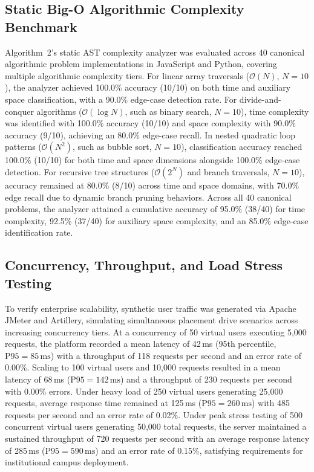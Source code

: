 \documentclass[conference]{IEEEtran}
\begin{document}
\subsection{Static Big-O Algorithmic Complexity Benchmark}
Algorithm~2's static AST complexity analyzer was evaluated across 40 canonical algorithmic problem implementations in JavaScript and Python, covering multiple algorithmic complexity tiers. For linear array traversals ($\mathcal{O}(N)$, $N=10$), the analyzer achieved 100.0\% accuracy (10/10) on both time and auxiliary space classification, with a 90.0\% edge-case detection rate. For divide-and-conquer algorithms ($\mathcal{O}(\log N)$, such as binary search, $N=10$), time complexity was identified with 100.0\% accuracy (10/10) and space complexity with 90.0\% accuracy (9/10), achieving an 80.0\% edge-case recall. In nested quadratic loop patterns ($\mathcal{O}(N^2)$, such as bubble sort, $N=10$), classification accuracy reached 100.0\% (10/10) for both time and space dimensions alongside 100.0\% edge-case detection. For recursive tree structures ($\mathcal{O}(2^N)$ and branch traversals, $N=10$), accuracy remained at 80.0\% (8/10) across time and space domains, with 70.0\% edge recall due to dynamic branch pruning behaviors. Across all 40 canonical problems, the analyzer attained a cumulative accuracy of 95.0\% (38/40) for time complexity, 92.5\% (37/40) for auxiliary space complexity, and an 85.0\% edge-case identification rate.

\subsection{Concurrency, Throughput, and Load Stress Testing}
To verify enterprise scalability, synthetic user traffic was generated via Apache JMeter and Artillery, simulating simultaneous placement drive scenarios across increasing concurrency tiers. At a concurrency of 50 virtual users executing 5,000 requests, the platform recorded a mean latency of 42\,ms (95th percentile, $\text{P95} = 85\,\text{ms}$) with a throughput of 118 requests per second and an error rate of 0.00\%. Scaling to 100 virtual users and 10,000 requests resulted in a mean latency of 68\,ms ($\text{P95} = 142\,\text{ms}$) and a throughput of 230 requests per second with 0.00\% errors. Under heavy load of 250 virtual users generating 25,000 requests, average response time remained at 125\,ms ($\text{P95} = 260\,\text{ms}$) with 485 requests per second and an error rate of 0.02\%. Under peak stress testing of 500 concurrent virtual users generating 50,000 total requests, the server maintained a sustained throughput of 720 requests per second with an average response latency of 285\,ms ($\text{P95} = 590\,\text{ms}$) and an error rate of 0.15\%, satisfying requirements for institutional campus deployment.
\end{document}
